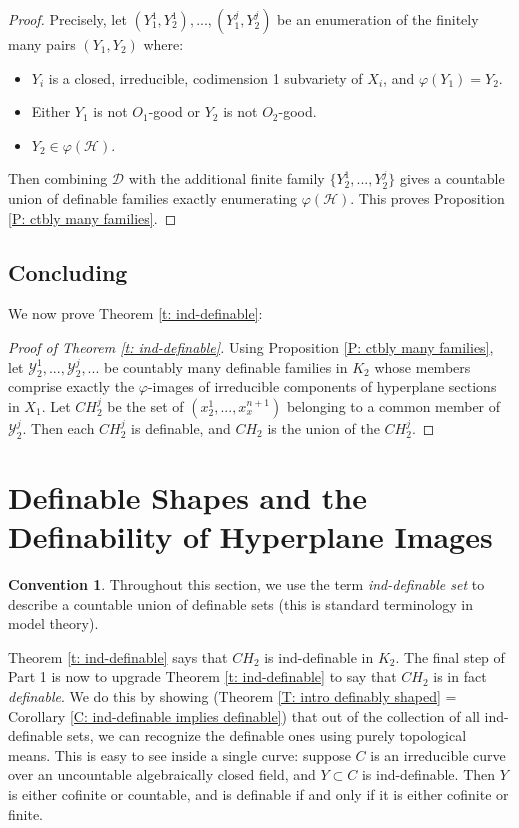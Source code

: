 \documentclass{amsart}
\theoremstyle{definition}
\newtheorem{convention}[theorem]{Convention}
\begin{document}
\begin{proof}
  Precisely, let $(Y_1^1,Y_2^1),...,(Y_1^j,Y_2^j)$ be an enumeration of the finitely many pairs $(Y_1,Y_2)$ where:
  \begin{itemize}
      \item $Y_i$ is a closed, irreducible, codimension 1 subvariety of $X_i$, and $\varphi(Y_1)=Y_2$.
      \item Either $Y_1$ is not $O_1$-good or $Y_2$ is not $O_2$-good.
      \item $Y_2\in\mathcal\varphi(\mathcal H)$.
  \end{itemize}
    Then combining $\mathcal D$ with the additional finite family $\{Y_2^1,...,Y_2^j\}$ gives a countable union of definable families exactly enumerating $\varphi(\mathcal H)$. This proves Proposition \ref{P: ctbly many families}.
\end{proof}
\subsection{Concluding}

We now prove Theorem \ref{t: ind-definable}:

\begin{proof}[Proof of Theorem \ref{t: ind-definable}] Using Proposition \ref{P: ctbly many families}, let $\mathcal Y_2^1,...,\mathcal Y_2^j,...$ be countably many definable families in $K_2$ whose members comprise exactly the $\varphi$-images of irreducible components of hyperplane sections in $X_1$. Let $CH_2^j$ be the set of $(x_2^1,...,x_x^{n+1})$ belonging to a common member of $\mathcal Y_2^j$. Then each $CH_2^j$ is definable, and $CH_2$ is the union of the $CH_2^j$. 
\end{proof}

\section{Definable Shapes and the Definability of Hyperplane Images}

\begin{convention}
    Throughout this section, we use the term \textit{ind-definable set} to describe a countable union of definable sets (this is standard terminology in model theory).
\end{convention} 

Theorem \ref{t: ind-definable} says that $CH_2$ is ind-definable in $K_2$. The final step of Part 1 is now to upgrade Theorem \ref{t: ind-definable} to say that $CH_2$ is in fact \textit{definable}. We do this by showing (Theorem \ref{T: intro definably shaped} = Corollary \ref{C: ind-definable implies definable}) that out of the collection of all ind-definable sets, we can recognize the definable ones using purely topological means. This is easy to see inside a single curve: suppose $C$ is an irreducible curve over an uncountable algebraically closed field, and $Y\subset C$ is ind-definable. Then $Y$ is either cofinite or countable, and is definable if and only if it is either cofinite or finite.
\end{document}
